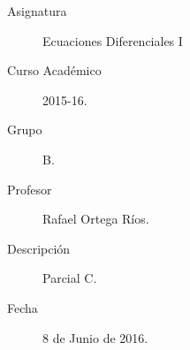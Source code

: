 \documentclass[12pt]{article}
\begin{document}

    
    

    \begin{description}
        \item[Asignatura] Ecuaciones Diferenciales I
        \item[Curso Académico] 2015-16.
        \item[Grupo] B.
        \item[Profesor] Rafael Ortega Ríos.
        \item[Descripción] Parcial C.
        \item[Fecha] 8 de Junio de 2016.
    
    \end{description}
    \newpage
\end{document}
